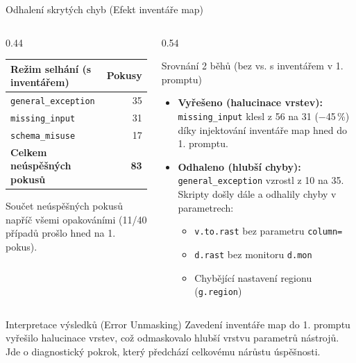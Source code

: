 \documentclass[aspectratio=169,10pt]{beamer}
\begin{document}
\begin{frame}[t]{Odhalení skrytých chyb (Efekt inventáře map)}
  \small
  \begin{columns}[T,onlytextwidth]
    \begin{column}{0.44\textwidth}
      \begin{table}
        \centering
        \footnotesize
        \begin{tabular}{@{}lr@{}}
          \toprule
          \textbf{Režim selhání (s inventářem)} & \textbf{Pokusy} \\
          \midrule
          \texttt{general\_exception} & 35 \\
          \texttt{missing\_input} & 31 \\
          \texttt{schema\_misuse} & 17 \\
          \midrule
          \textbf{Celkem neúspěšných pokusů} & \textbf{83} \\
          \bottomrule
        \end{tabular}
      \end{table}
      \vspace{-1mm}
      {\scriptsize *Součet neúspěšných pokusů napříč všemi opakováními (11/40 případů prošlo hned na 1. pokus).}
    \end{column}

    \begin{column}{0.54\textwidth}
      \begin{block}{Srovnání 2 běhů (bez vs. s inventářem v 1. promptu)}
        \begin{itemize}
          \item \textbf{Vyřešeno (halucinace vrstev):} 
            \texttt{missing\_input} klesl z 56 na 31 ($-$45\,\%) díky injektování inventáře map hned do 1. promptu.
          \item \textbf{Odhaleno (hlubší chyby):} 
            \texttt{general\_exception} vzrostl z 10 na 35. Skripty došly dále a odhalily chyby v parametrech:
            \begin{itemize}
              \item \texttt{v.to.rast} bez parametru \texttt{column=}
              \item \texttt{d.rast} bez monitoru \texttt{d.mon}
              \item Chybějící nastavení regionu (\texttt{g.region})
            \end{itemize}
        \end{itemize}
      \end{block}
    \end{column}
  \end{columns}

  \vspace{2mm}

  \begin{alertblock}{Interpretace výsledků (Error Unmasking)}
    Zavedení inventáře map do 1. promptu vyřešilo halucinace vrstev, což odmaskovalo hlubší vrstvu parametrů nástrojů. Jde o diagnostický pokrok, který předchází celkovému nárůstu úspěšnosti.
  \end{alertblock}
\end{frame}
\end{document}

